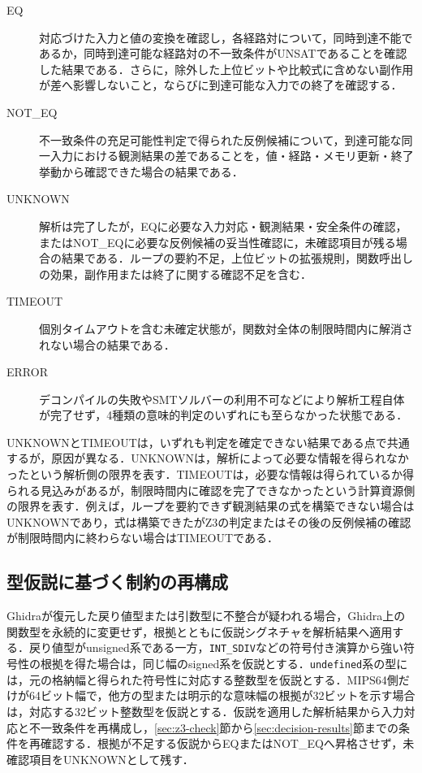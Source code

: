 \begin{description}
  \item[EQ] 対応づけた入力と値の変換を確認し，各経路対について，同時到達不能であるか，同時到達可能な経路対の不一致条件がUNSATであることを確認した結果である．さらに，除外した上位ビットや比較式に含めない副作用が差へ影響しないこと，ならびに到達可能な入力での終了を確認する．
  \item[NOT\_EQ] 不一致条件の充足可能性判定で得られた反例候補について，到達可能な同一入力における観測結果の差であることを，値・経路・メモリ更新・終了挙動から確認できた場合の結果である．
  \item[UNKNOWN] 解析は完了したが，EQに必要な入力対応・観測結果・安全条件の確認，またはNOT\_EQに必要な反例候補の妥当性確認に，未確認項目が残る場合の結果である．ループの要約不足，上位ビットの拡張規則，関数呼出しの効果，副作用または終了に関する確認不足を含む．
  \item[TIMEOUT] 個別タイムアウトを含む未確定状態が，関数対全体の制限時間内に解消されない場合の結果である．
  \item[ERROR] デコンパイルの失敗やSMTソルバーの利用不可などにより解析工程自体が完了せず，4種類の意味的判定のいずれにも至らなかった状態である．
\end{description}

UNKNOWNとTIMEOUTは，いずれも判定を確定できない結果である点で共通するが，原因が異なる．UNKNOWNは，解析によって必要な情報を得られなかったという解析側の限界を表す．TIMEOUTは，必要な情報は得られているか得られる見込みがあるが，制限時間内に確認を完了できなかったという計算資源側の限界を表す．例えば，ループを要約できず観測結果の式を構築できない場合はUNKNOWNであり，式は構築できたがZ3の判定またはその後の反例候補の確認が制限時間内に終わらない場合はTIMEOUTである．

\subsection{型仮説に基づく制約の再構成}\label{sec:retry}
Ghidraが復元した戻り値型または引数型に不整合が疑われる場合，Ghidra上の関数型を永続的に変更せず，根拠とともに仮説シグネチャを解析結果へ適用する．戻り値型がunsigned系である一方，\texttt{INT\_SDIV}などの符号付き演算から強い符号性の根拠を得た場合は，同じ幅のsigned系を仮説とする．\texttt{undefined}系の型には，元の格納幅と得られた符号性に対応する整数型を仮説とする．MIPS64側だけが64ビット幅で，他方の型または明示的な意味幅の根拠が32ビットを示す場合は，対応する32ビット整数型を仮説とする．仮説を適用した解析結果から入力対応と不一致条件を再構成し，\ref{sec:z3-check}節から\ref{sec:decision-results}節までの条件を再確認する．根拠が不足する仮説からEQまたはNOT\_EQへ昇格させず，未確認項目をUNKNOWNとして残す．

